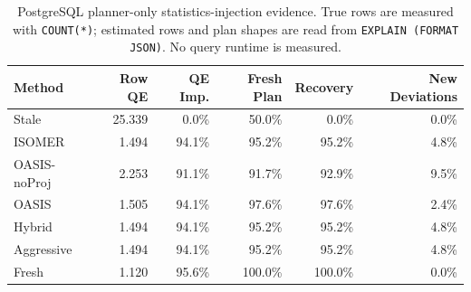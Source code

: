 \begin{table}[t]
  \centering
  \small
  \caption{PostgreSQL planner-only statistics-injection evidence. True rows are measured with \texttt{COUNT(*)}; estimated rows and plan shapes are read from \texttt{EXPLAIN (FORMAT JSON)}. No query runtime is measured.}
  \label{tab:postgres_planner_stats_injection}
  \setlength{\tabcolsep}{4pt}
  \begin{tabular}{lrrrrr}
    \toprule
    Method & Row QE & QE Imp. & Fresh Plan & Recovery & New Deviations \\
    \midrule
    Stale & 25.339 & 0.0\% & 50.0\% & 0.0\% & 0.0\% \\
    ISOMER & 1.494 & 94.1\% & 95.2\% & 95.2\% & 4.8\% \\
    OASIS-noProj & 2.253 & 91.1\% & 91.7\% & 92.9\% & 9.5\% \\
    OASIS & 1.505 & 94.1\% & 97.6\% & 97.6\% & 2.4\% \\
    Hybrid & 1.494 & 94.1\% & 95.2\% & 95.2\% & 4.8\% \\
    Aggressive & 1.494 & 94.1\% & 95.2\% & 95.2\% & 4.8\% \\
    Fresh & 1.120 & 95.6\% & 100.0\% & 100.0\% & 0.0\% \\
    \bottomrule
  \end{tabular}
\end{table}

